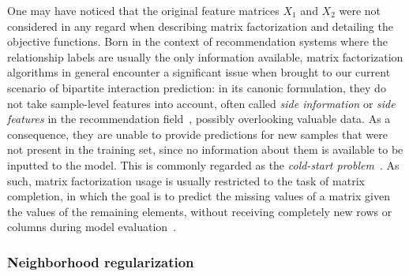 % 

One may have noticed that the original feature matrices $X_1$ and $X_2$ were not considered in any regard when describing matrix factorization and detailing the objective functions.
Born in the context of recommendation systems where the relationship labels are usually the only information available, matrix factorization algorithms in general encounter a significant issue when brought to our current scenario of bipartite interaction prediction:
in its canonic formulation, they do not take sample-level features into account, often called \emph{side information} or \emph{side features} in the recommendation field~\cite{}, possibly overlooking valuable data. As a consequence, they are unable to provide predictions for new samples that were not present in the training set, since no information about them is available to be inputted to the model. This is commonly regarded as the \emph{cold-start problem}~\cite{}. As such, matrix factorization usage is usually restricted to the task of matrix completion, in which the goal is to predict the missing values of a matrix given the values of the remaining elements, without receiving completely new rows or columns during model evaluation~\cite{}.


\subsubsection{Neighborhood regularization}
\label{sec:neighborhood regularization}

